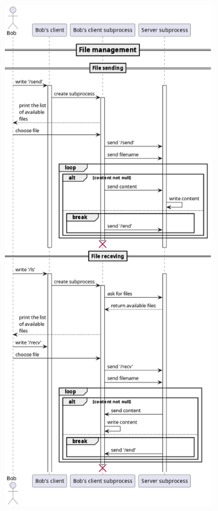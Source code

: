 \documentclass[a4paper,12pt]{article}
\begin{document}
\pagebreak

\begin{figure}[h!]
	\ContinuedFloat
	\centering
	\begin{subfigure}{0.45\linewidth}
		\includegraphics[width=\linewidth]{fileManagement.png}

\end{subfigure}
\end{figure}
\end{document}
